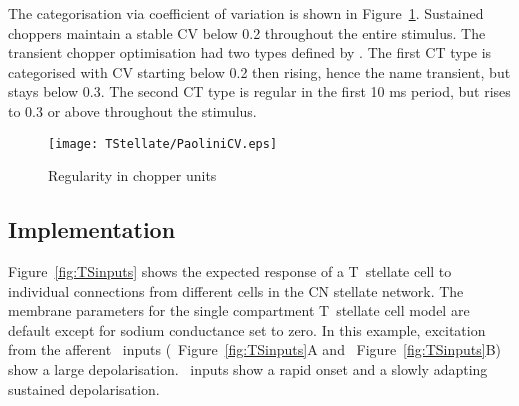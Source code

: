 The categorisation via coefficient of variation is shown in Figure~\ref{fig:PaoliniCVdata}.
Sustained choppers maintain a stable CV below 0.2 throughout the entire stimulus. The transient chopper optimisation had two types defined by \citep{PaoliniClareyEtAl:2005}.
The first CT type is categorised with CV starting below 0.2 then rising, hence the name transient, but stays below 0.3.
The second CT type is regular in the first 10 ms period, but rises to 0.3 or above throughout the stimulus.

\begin{figure}[htb]
\centering%
\texttt{[image: TStellate/PaoliniCV.eps]}
\caption{Regularity in chopper units \citep[Data reproduced from Fig.~2,~][]{PaoliniClareyEtAl:2005}}
\label{fig:PaoliniCVdata}
\end{figure}

\subsection{Implementation}


Figure~\ref{fig:TSinputs} shows the expected response of a T~stellate cell to individual connections from different cells in the CN stellate network.
The membrane parameters for the single compartment T~stellate cell model are default except for sodium conductance set to zero.
In this example, excitation from the afferent \ANF~inputs (\LSR~Figure~\ref{fig:TSinputs}A and \HSR~Figure~\ref{fig:TSinputs}B) show a large depolarisation.
\HSR~inputs show a rapid onset and a slowly adapting sustained depolarisation.




